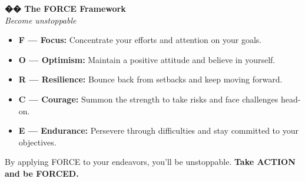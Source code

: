 \documentclass[11pt,a4paper]{article}
\begin{document}
\begin{mindsetbox}
    \textbf{\color{primary}\Large �� The FORCE Framework}\\[0.3em]
    {\color{textGray}\itshape Become unstoppable}

    \vspace{1em}

    \begin{itemize}[leftmargin=1.5em, itemsep=0.5em]
        \item \textbf{\color{primary}F --- Focus:} Concentrate your efforts and attention on your goals.
        \item \textbf{\color{primary}O --- Optimism:} Maintain a positive attitude and believe in yourself.
        \item \textbf{\color{primary}R --- Resilience:} Bounce back from setbacks and keep moving forward.
        \item \textbf{\color{primary}C --- Courage:} Summon the strength to take risks and face challenges head-on.
        \item \textbf{\color{primary}E --- Endurance:} Persevere through difficulties and stay committed to your objectives.
    \end{itemize}

    \vspace{1em}

    By applying FORCE to your endeavors, you'll be unstoppable. \textbf{Take ACTION and be FORCED.}
\end{mindsetbox}
\end{document}
